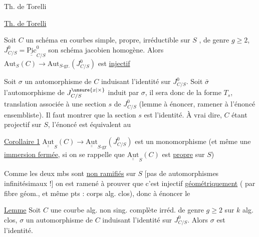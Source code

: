 
Th. de Torelli



\uline{Th. de Torelli}

\uline{} Soit $C$ un schéma en courbes simple, propre, irréductible sur $S$ , de genre $g\geq 2$, $J^0_{C/S}=\underline{\underline{\mathrm{Pic}}}^0_{C/S}$ son schéma jacobien homogène. Alors $\mathrm{Aut}_S(C)\longrightarrow\mathrm{Aut}_{S\text{-gr.}}(J^0_{C/S})$ est \uline{injectif}

Soit $\sigma$ un automorphisme de $C$ induisant l'identité sur $J^0_{C/S}$. Soit $\bar{\sigma}$ l'automorphisme de $J^{\unsure{x|\times}}_{C/S}$ induit par $\sigma$, il sera donc de la forme $T_s$, translation associée à une section $s$ de $J^0_{C/S}$ (lemme à énoncer,   ramener à l'énoncé ensembliste). Il faut montrer que la section $s$ est l'identité. À vrai dire, $C$ étant projectif sur $S$, l'énoncé est équivalent au

\uline{Corollaire 1} $\underline{\underline{\mathrm{Aut}}}_S(C)\longrightarrow\underline{\underline{\mathrm{Aut}}}_{S\text{-gr}}(J^0_{C/S})$ est un monomorphisme (et même une \uline{immersion fermée}, si on se rappelle que $\underline{\underline{\mathrm{Aut}}}_S(C)$ est \uline{propre} sur $S$)

Comme les deux mbs sont \uline{non ramifiés} sur $S$ [pas de automorphismes infinitésimaux !] on est ramené  à prouver que c'est injectif \uline{géométriquement} (  par fibre géom., et même pts :  corps alg. clos), donc à énoncer le



\uline{Lemme} Soit $C$ une courbe alg. non sing. complète  irréd. de genre $g\geq 2$ sur $k$ alg. clos, $\sigma$ un automorphisme de $C$ induisant l'identité sur $J^0_{C/S}$. Alors $\sigma$ est l'identité.

